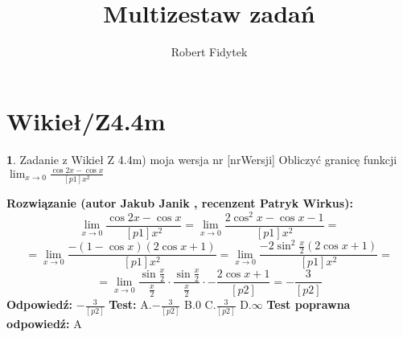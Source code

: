 \documentclass[12pt, a4paper]{article}
\title{Multizestaw zadań}
\author{Robert Fidytek}
\date{}
\theoremstyle{definition} %
\newtheorem{zad}{}
\newcommand{\kategoria}[1]{\section{#1}} %
\newcommand{\zadStart}[1]{\begin{zad}#1\newline} %
\newcommand{\zadStop}{\end{zad}}   %
\newcommand{\rozwStart}[2]{\noindent \textbf{Rozwiązanie (autor #1 , recenzent #2): }\newline} %
\newcommand{\rozwStop}{\newline}                                            %
\newcommand{\odpStart}{\noindent \textbf{Odpowiedź:}\newline}    %
\newcommand{\odpStop}{\newline}                                             %
\newcommand{\testStart}{\noindent \textbf{Test:}\newline} %
\newcommand{\testStop}{\newline} %
\newcommand{\kluczStart}{\noindent \textbf{Test poprawna odpowiedź:}\newline} %
\newcommand{\kluczStop}{\newline} %
\begin{document}
\maketitle


\kategoria{Wikieł/Z4.4m}
\zadStart{Zadanie z Wikieł Z 4.4m) moja wersja nr [nrWersji]}
Obliczyć granicę funkcji $\lim_{x \to 0} \frac{\cos{2x}-\cos{x}}{[p1]x^2}$
\zadStop
\rozwStart{Jakub Janik}{Patryk Wirkus}
$$\lim_{x \to 0} \frac{\cos{2x}-\cos{x}}{[p1]x^2}=\lim_{x \to 0} \frac{2\cos^2{x}-\cos{x}-1}{[p1]x^2}=$$
$$=\lim_{x \to 0} \frac{-(1-\cos{x})(2\cos{x}+1)}{[p1]x^2}=\lim_{x \to 0} \frac{-2\sin^2{\frac{x}{2}}(2\cos{x}+1)}{[p1]x^2}=$$
$$=\lim_{x \to 0} \frac{\sin{\frac{x}{2}}}{\frac{x}{2}}\cdot\frac{\sin{\frac{x}{2}}}{\frac{x}{2}}\cdot-\frac{2\cos{x}+1}{[p2]}=-\frac{3}{[p2]}$$
\rozwStop
\odpStart
$-\frac{3}{[p2]}$
\odpStop
\testStart
A.$-\frac{3}{[p2]}$
B.$0$
C.$\frac{3}{[p2]}$
D.$\infty$
\testStop
\kluczStart
A
\kluczStop
\end{document}
